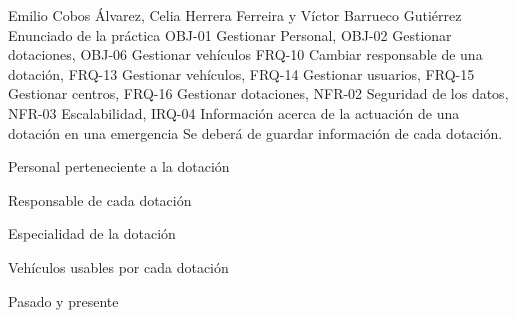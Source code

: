 {Emilio Cobos Álvarez, Celia Herrera Ferreira y Víctor Barrueco Gutiérrez}
{Enunciado de la práctica}
{OBJ-01 Gestionar Personal, OBJ-02 Gestionar dotaciones, OBJ-06 Gestionar vehículos}
{FRQ-10 Cambiar responsable de una dotación, FRQ-13 Gestionar vehículos, FRQ-14 Gestionar usuarios, FRQ-15 Gestionar centros, FRQ-16 Gestionar dotaciones, NFR-02 Seguridad de los datos, NFR-03 Escalabilidad, IRQ-04 Información acerca de la actuación de una dotación en una emergencia}
{Se deberá de guardar información de cada dotación.}
{
\item{Personal perteneciente a la dotación}
\item{Responsable de cada dotación}
\item{Especialidad de la dotación}
\item{Vehículos usables por cada dotación}
}
{Pasado y presente}

